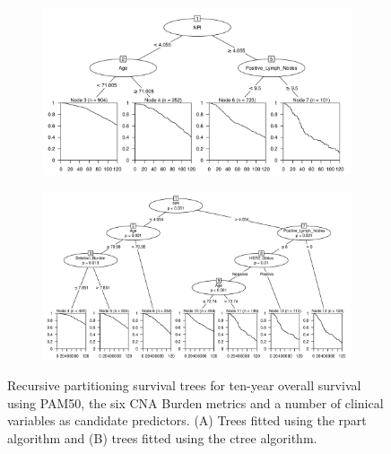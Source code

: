 \begin{figure}[!htb]
\centering

\vspace{1cm}

\begin{subfigure}{\textwidth}
\subcaption{}
\includegraphics[width=1\textwidth]{../figures/Appendices/Appendix_B/Clin_PartyKit_Survival_Burden_TenYearOS_PAM50.png}
\end{subfigure}

\vspace{2cm}

\begin{subfigure}{\textwidth}
\subcaption{}
\includegraphics[width=1\textwidth]{../figures/Appendices/Appendix_B/Clin_Ctree_Survival_Burden_TenYearOS_PAM50.png}
\end{subfigure}

\vspace{1cm}

\caption[Recursive partitioning survival trees for ten-year overall survival using PAM50, the six CNA Burden metrics and a number of clinical variables as candidate predictors.]{Recursive partitioning survival trees for ten-year overall survival using PAM50, the six CNA Burden metrics and a number of clinical variables as candidate predictors. (A) Trees fitted using the rpart algorithm and (B) trees fitted using the ctree algorithm.}
\end{figure}

